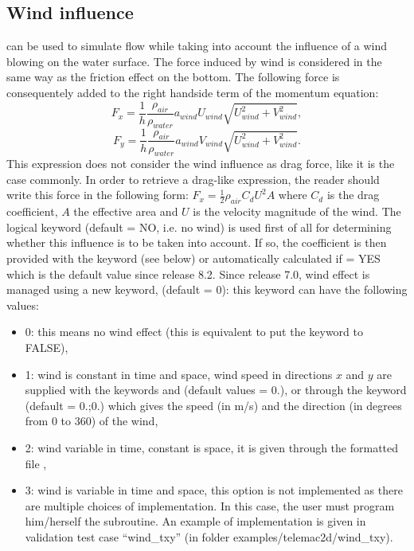 \subsection{Wind influence}

 can be used to simulate flow while taking into account the
influence of a wind blowing on the water surface.
The force induced by wind is considered in the same way as the friction effect
on the bottom.
The following force is consequentely added to the right handside term of the
momentum equation:
\begin{equation}
F_x = \frac{1}{h} \frac{\rho_{air}}{\rho_{water}}a_{wind}U_{wind}\sqrt{U^2_{wind}+V^2_{wind}},
\end{equation}
\begin{equation}
F_y = \frac{1}{h} \frac{\rho_{air}}{\rho_{water}}a_{wind}V_{wind}\sqrt{U^2_{wind}+V^2_{wind}}.
\end{equation}
This expression does not consider the wind influence as drag force,
like it is the case commonly.
In order to retrieve a drag-like expression, the reader should write this force
in the following form:
$F_x = \frac{1}{2}\rho_{air}C_d U^2 A$ where $C_d$ is the drag coefficient,
$A$ the effective area and $U$ is the velocity magnitude of the wind.
The logical keyword  (default = NO, i.e. no wind) is used first of
all for determining whether this influence is to be taken into account.
If so, the coefficient is then provided with the keyword
 (see below) or automatically calculated
if  = YES
which is the default value since release 8.2.
Since release 7.0, wind effect is managed using a new keyword,
 (default = 0): this keyword can have the following
values:

\begin{itemize}
\item 0: this means no wind effect (this is equivalent to put the
 keyword  to FALSE),

\item 1: wind is constant in time and space, wind speed in directions
$x$ and $y$ are supplied with the keywords  and
 (default values = 0.),
or through the keyword  (default = 0.;0.)
which gives the speed (in m/s) and the direction (in degrees from 0 to 360) of
the wind,

\item 2: wind variable in time, constant is space,
it is given through the formatted file ,

\item 3: wind is variable in time and space, this option is not
implemented as there are multiple choices of implementation.
In this case, the user must program him/herself the  subroutine.
An example of implementation is given in validation test case ``wind\_txy''
(in folder examples/telemac2d/wind\_txy).
\end{itemize}

